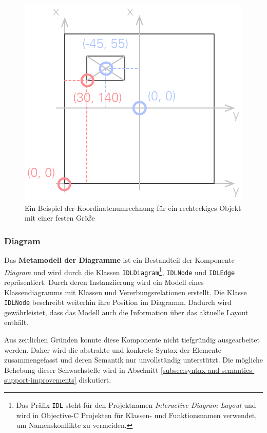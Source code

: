 \begin{figure}[hbt]
    \centering
    \includegraphics{assets/coordinates-conversion}
    \caption{Ein Beispiel der Koordinatenumrechnung für ein rechteckiges Objekt mit einer festen Größe}
    \label{fig:coordinates-conversion}
\end{figure}

\subsubsection{Diagram}
\label{subsubsec:component-diagram}

Das \textbf{Metamodell der Diagramme} ist ein Bestandteil der Komponente \textit{Diagram} und wird durch die Klassen \texttt{IDLDiagram}\footnote{Das Präfix \texttt{IDL} steht für den Projektnamen \textit{Interactive Diagram Layout} und wird in Objective-C Projekten für Klassen- und Funktionsnamen verwendet, um Namenskonflikte zu vermeiden.}, \texttt{IDLNode} und \texttt{IDLEdge} repräsentiert. Durch deren Instanziierung wird ein Modell eines Klassendiagramms mit Klassen und Vererbungsrelationen erstellt. Die Klasse \texttt{IDLNode} beschreibt weiterhin ihre Position im Diagramm. Dadurch wird gewährleistet, dass das Modell auch die Information über das aktuelle Layout enthält.

Aus zeitlichen Gründen konnte diese Komponente nicht tiefgründig ausgearbeitet werden. Daher wird die abstrakte und konkrete Syntax der Elemente zusammengefasst und deren Semantik nur unvollständig unterstützt. Die mögliche Behebung dieser Schwachstelle wird in Abschnitt \ref{subsec:syntax-and-semantics-support-improvements} diskutiert.

